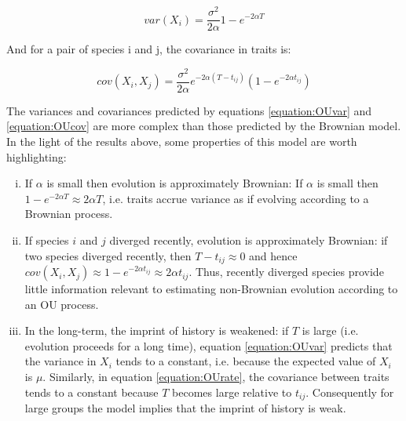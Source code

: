 \documentclass[a4paper,12pt]{article}
\begin{document}
    \begin{equation}
      var(X_i) = \frac{\sigma^2}{2 \alpha} 1 - e^{-2 \alpha T}
      \label{equation:OUvar} 
    \end{equation}

  And for a pair of species i and j, the covariance in traits is:

    \begin{equation}
      cov(X_i, X_j) = \frac{\sigma^2}{2 \alpha} e^{-2 \alpha (T - t_{ij})} (1 - e^{-2\alpha t_{ij}})
      \label{equation:OUcov} 
    \end{equation}

  The variances and covariances predicted by equations \ref{equation:OUvar} and \ref{equation:OUcov} are more complex than those predicted by the Brownian model. 
  In the light of the results above, some properties of this model are worth highlighting:

  \begin{enumerate}[(i)]
    \item If $\alpha$ is small then evolution is approximately Brownian: If $\alpha$ is small then $1 - e^{-2\alpha T} \approx 2\alpha T$, i.e. traits accrue variance as if evolving according to a Brownian process.\\ 

    \item If species $i$ and $j$ diverged recently, evolution is approximately Brownian: if two species diverged recently, then $T - t_{ij} \approx 0$ and hence $cov(X_i, X_j) \approx 1 - e^{-2\alpha t_{ij}} \approx 2\alpha t_{ij}$. 
    Thus, recently diverged species provide little information relevant to estimating non-Brownian evolution according to an OU process.\\ 

    \item In the long-term, the imprint of history is weakened: if $T$ is large (i.e. evolution proceeds for a long time), equation \ref{equation:OUvar} predicts that the variance in $X_i$ tends to a constant, i.e. because the expected value of $X_i$ is $\mu$. 
    Similarly, in equation \ref{equation:OUrate}, the covariance between traits tends to a constant because $T$ becomes large relative to $t_{ij}$.
    Consequently for large groups the model implies that the imprint of history is weak.\\
  \end{enumerate}


\end{document}
